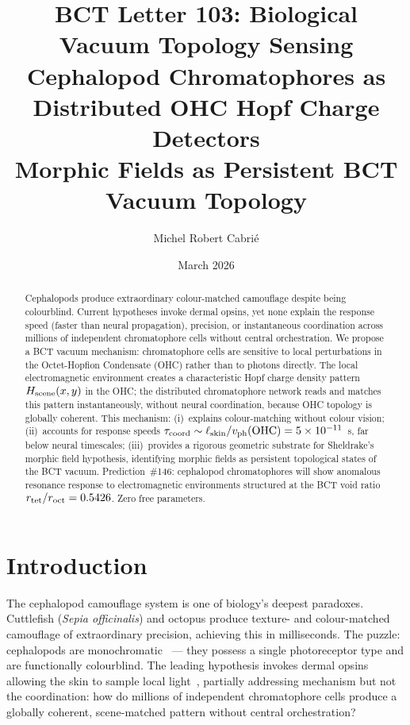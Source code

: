 \documentclass[twocolumn,10pt]{article}
\begin{document}
\title{BCT Letter 103: Biological Vacuum Topology Sensing\\
Cephalopod Chromatophores as Distributed OHC Hopf Charge Detectors\\
Morphic Fields as Persistent BCT Vacuum Topology}

\author{Michel Robert Cabri\'{e}}
\date{March 2026}


\maketitle
\begin{abstract}
Cephalopods produce extraordinary colour-matched camouflage despite being colourblind.
Current hypotheses invoke dermal opsins, yet none explain the response speed (faster than
neural propagation), precision, or instantaneous coordination across millions of independent
chromatophore cells without central orchestration. We propose a BCT vacuum mechanism:
chromatophore cells are sensitive to local perturbations in the Octet-Hopfion Condensate
(OHC) rather than to photons directly. The local electromagnetic environment creates a
characteristic Hopf charge density pattern $H_{\rm scene}(x,y)$ in the OHC; the distributed
chromatophore network reads and matches this pattern instantaneously, without neural
coordination, because OHC topology is globally coherent. This mechanism: (i)~explains
colour-matching without colour vision; (ii)~accounts for response speeds
$\tau_{\rm coord} \sim \ell_{\rm skin}/v_{\rm ph}({\rm OHC}) = 5\times10^{-11}$~s,
far below neural timescales; (iii)~provides a rigorous geometric substrate for
Sheldrake's morphic field hypothesis, identifying morphic fields as persistent
topological states of the BCT vacuum. Prediction~\#146: cephalopod chromatophores will
show anomalous resonance response to electromagnetic environments structured at the BCT
void ratio $r_{\rm tet}/r_{\rm oct} = 0.5426$. Zero free parameters.
\end{abstract}



\section{Introduction}

The cephalopod camouflage system is one of biology's deepest paradoxes. Cuttlefish
(\textit{Sepia officinalis}) and octopus produce texture- and colour-matched camouflage
of extraordinary precision, achieving this in milliseconds. The puzzle: cephalopods are
monochromatic~\cite{mathger2006} --- they possess a single photoreceptor type and are
functionally colourblind. The leading hypothesis invokes dermal opsins allowing the skin
to sample local light~\cite{ramirez2015}, partially addressing mechanism but not the
coordination: how do millions of independent chromatophore cells produce a globally
coherent, scene-matched pattern without central orchestration?
\end{document}
